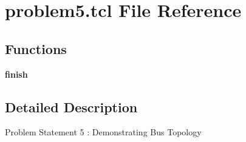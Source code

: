 \hypertarget{problem5_8tcl}{}\section{problem5.\+tcl File Reference}
\label{problem5_8tcl}
\subsection*{Functions}
\begin{DoxyCompactItemize}
\item 
\mbox{\label{problem5_8tcl_a30728837c246b65ef76298af0101d99c}} 
{\bfseries finish}
\end{DoxyCompactItemize}


\subsection{Detailed Description}
Problem Statement 5 \+: Demonstrating Bus Topology

\begin{DoxyVerb}
\end{DoxyVerb}
